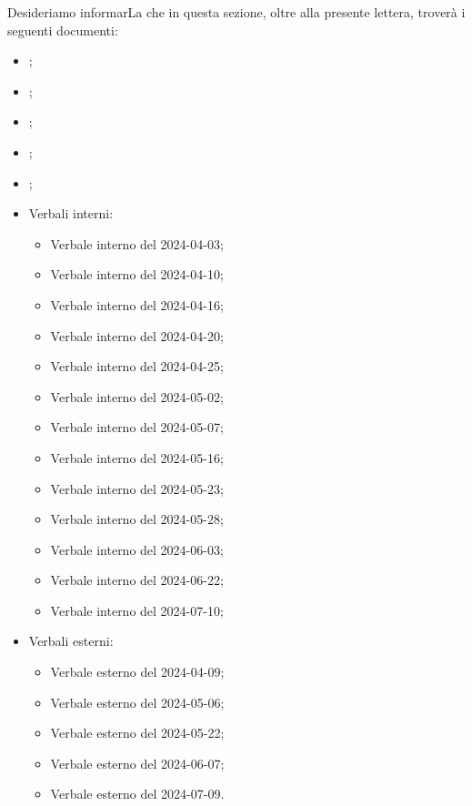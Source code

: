 \par Desideriamo informarLa che in questa sezione, oltre alla presente lettera, troverà i seguenti documenti:
\begin{itemize}
    \item \AnalisiDeiRequisiti;
    \item \Glossario;
    \item \NormeDiProgetto;
    \item \PianoDiProgetto;
    \item \PianoDiQualifica; 
    \item Verbali interni: 
        \begin{itemize}
            \item Verbale interno del 2024-04-03;
            \item Verbale interno del 2024-04-10;
            \item Verbale interno del 2024-04-16;
            \item Verbale interno del 2024-04-20;
            \item Verbale interno del 2024-04-25;
            \item Verbale interno del 2024-05-02;
            \item Verbale interno del 2024-05-07;
            \item Verbale interno del 2024-05-16;
            \item Verbale interno del 2024-05-23;
            \item Verbale interno del 2024-05-28;
            \item Verbale interno del 2024-06-03;
            \item Verbale interno del 2024-06-22;
            \item Verbale interno del 2024-07-10;
        \end{itemize}
    \item Verbali esterni:
    \begin{itemize}
        \item Verbale esterno del 2024-04-09;
        \item Verbale esterno del 2024-05-06;
        \item Verbale esterno del 2024-05-22;
        \item Verbale esterno del 2024-06-07;
        \item Verbale esterno del 2024-07-09.
    \end{itemize}
\end{itemize}


